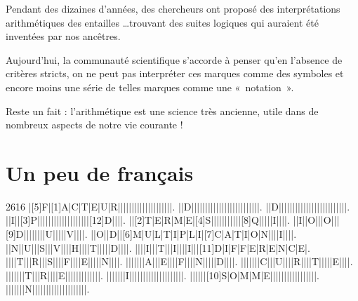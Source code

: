 \documentclass[../../syllabus_1.tex]{subfiles}
\begin{document}
Pendant des dizaines d'années, des chercheurs ont proposé des interprétations arithmétiques des entailles \dots trouvant des suites logiques qui auraient été inventées par nos ancêtres.

Aujourd'hui, la communauté scientifique s'accorde à penser qu'en l'absence de critères stricts, on ne peut pas interpréter ces marques comme des symboles et encore moins une série de telles marques comme une «~notation~».

Reste un fait : l'arithmétique est une science très ancienne, utile dans de nombreux aspects de notre vie courante !


\section{Un peu de français}
\begin{Puzzle}{26}{16}
    |[5]F|[1]A|C|T|E|U|R|{}|{}|{}|{}|{}|{}|{}|{}|{}|{}|{}|{}|{}|{}|{}|{}|{}|{}|{}|.
    |{}|D|{}|{}|{}|{}|{}|{}|{}|{}|{}|{}|{}|{}|{}|{}|{}|{}|{}|{}|{}|{}|{}|{}|{}|{}|.
    |{}|D|{}|{}|{}|{}|{}|{}|{}|{}|{}|{}|{}|{}|{}|{}|{}|{}|{}|{}|{}|{}|{}|{}|{}|{}|.
    |{}|I|{}|[3]P|{}|{}|{}|{}|{}|{}|{}|{}|{}|{}|{}|{}|{}|{}|{}|{}|{}|{}|[12]D|{}|{}|{}|.
    |{}|[2]T|E|R|M|E|[4]S|{}|{}|{}|{}|{}|{}|{}|{}|{}|{}|[8]Q|{}|{}|{}|{}|I|{}|{}|{}|.
    |{}|I|{}|O|{}|{}|O|{}|{}|[9]D|{}|{}|{}|{}|{}|{}|{}|U|{}|{}|{}|{}|V|{}|{}|{}|.
    |{}|O|{}|D|{}|[6]M|U|L|T|I|P|L|I|[7]C|A|T|I|O|N|{}|{}|{}|I|{}|{}|{}|.
    |{}|N|{}|U|{}|{}|S|{}|{}|V|{}|{}|{}|H|{}|{}|{}|T|{}|{}|{}|{}|D|{}|{}|{}|.
    |{}|{}|{}|I|{}|{}|T|{}|{}|I|{}|{}|{}|I|{}|{}|[11]D|I|F|F|E|R|E|N|C|E|.
    |{}|{}|{}|T|{}|{}|R|{}|{}|S|{}|{}|{}|F|{}|{}|{}|E|{}|{}|{}|{}|N|{}|{}|{}|.
    |{}|{}|{}|{}|{}|{}|A|{}|{}|E|{}|{}|{}|F|{}|{}|{}|N|{}|{}|{}|{}|D|{}|{}|{}|.
    |{}|{}|{}|{}|{}|{}|C|{}|{}|U|{}|{}|{}|R|{}|{}|{}|T|{}|{}|{}|{}|E|{}|{}|{}|.
    |{}|{}|{}|{}|{}|{}|T|{}|{}|R|{}|{}|{}|E|{}|{}|{}|{}|{}|{}|{}|{}|{}|{}|{}|{}|.
    |{}|{}|{}|{}|{}|{}|I|{}|{}|{}|{}|{}|{}|{}|{}|{}|{}|{}|{}|{}|{}|{}|{}|{}|{}|{}|.
    |{}|{}|{}|{}|{}|[10]S|O|M|M|E|{}|{}|{}|{}|{}|{}|{}|{}|{}|{}|{}|{}|{}|{}|{}|{}|.
    |{}|{}|{}|{}|{}|{}|N|{}|{}|{}|{}|{}|{}|{}|{}|{}|{}|{}|{}|{}|{}|{}|{}|{}|{}|{}|.
\end{Puzzle}
\end{document}
